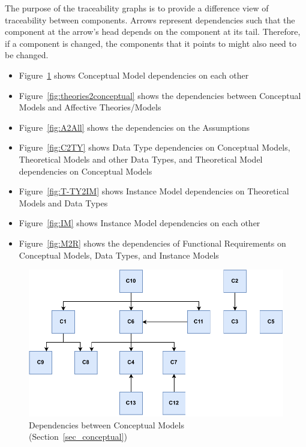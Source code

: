 The purpose of the traceability graphs is to provide a difference view of
traceability between components. Arrows represent dependencies such that the
component at the arrow's head depends on the component at its tail. Therefore,
if a component is changed, the components that it points to might also need to
be changed.
\begin{itemize}

    \item Figure~\ref{fig:conceptualdependencies} shows Conceptual Model
    dependencies on each other

    \item Figure~\ref{fig:theories2conceptual} shows the dependencies between
    Conceptual Models and Affective Theories/Models

    \item Figure~\ref{fig:A2All} shows the dependencies on the Assumptions

    \item Figure~\ref{fig:C2TY} shows Data Type dependencies on Conceptual
    Models, Theoretical Models and other Data Types, and Theoretical Model
    dependencies on Conceptual Models

    \item Figure~\ref{fig:T-TY2IM} shows Instance Model dependencies on
    Theoretical Models and Data Types

    \item Figure~\ref{fig:IM} shows Instance Model dependencies on each other

    \item Figure~\ref{fig:M2R} shows the dependencies of Functional
    Requirements on Conceptual Models, Data Types, and Instance Models

\end{itemize}

\vspace*{\fill}
\begin{figure}[tbh]
    \centering
    \includegraphics[width=0.87\linewidth]{figures/concept2concept.pdf}
    \caption[Dependencies between Conceptual Models]{Dependencies between
        Conceptual Models (Section~\ref{sec_conceptual})}
    \label{fig:conceptualdependencies}
\end{figure}
\vspace*{\fill}

